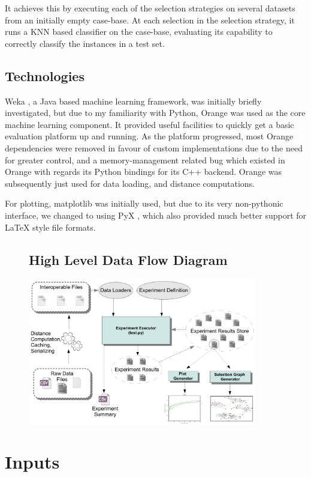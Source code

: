 \documentclass[a4paper,11pt]{report}
\begin{document}
It achieves this by executing each of the selection strategies on several datasets from an initially empty case-base. At each selection in the selection strategy, it runs a KNN based classifier on the case-base, evaluating its capability to correctly classify the instances in a test set.

\subsection{Technologies}
Weka \citep{prog:weka}, a Java based machine learning framework, was initially briefly investigated, but due to my familiarity with Python, Orange \citep{prog:orange} was used as the core machine learning component. It provided useful facilities to quickly get a basic evaluation platform up and running. As the platform progressed, most Orange dependencies were removed in favour of custom implementations due to the need for greater control, and a memory-management related bug which existed in Orange with regards its Python bindings for its C++ backend. Orange was subsequently just used for data loading, and distance computations.

For plotting, matplotlib \citep{prog:matplotlib} was initially used, but due to its very non-pythonic interface, we changed to using PyX \citep{prog:pyx}, which also provided much better support for \LaTeX{} style file formats.

\begin{figure}[h!]
\subsection{High Level Data Flow Diagram}
 \centering
\includegraphics[width=10cm]{./Drawn/DataFlowDiagram}
\end{figure}

\section{Inputs}
\end{document}
